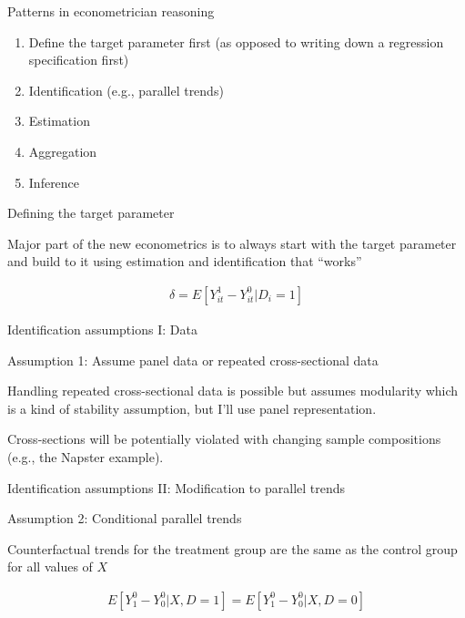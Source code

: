 \documentclass{beamer}
\begin{document}
\begin{frame}{Patterns in econometrician reasoning}

\begin{enumerate}
\item Define the target parameter first (as opposed to writing down a regression specification first)
\item Identification (e.g., parallel trends)
\item Estimation
\item Aggregation
\item Inference
\end{enumerate}

\end{frame}


\begin{frame}{Defining the target parameter}

Major part of the new econometrics is to always start with the target parameter and build to it using estimation and identification that ``works''

\bigskip

\begin{eqnarray*}
\delta = E[Y^1_{it} - Y^0_{it} | D_i=1]
\end{eqnarray*}

\end{frame}

\begin{frame}{Identification assumptions I: Data}

Assumption 1: Assume panel data or repeated cross-sectional data

\bigskip

Handling repeated cross-sectional data is possible but assumes modularity which is a kind of stability assumption, but I'll use panel representation. 

\bigskip

Cross-sections will be potentially violated with changing sample compositions (e.g., the Napster example). 

\end{frame}

\begin{frame}{Identification assumptions II: Modification to parallel trends}

Assumption 2: Conditional parallel trends

\bigskip

Counterfactual trends for the treatment group are the same as the control group for all values of $X$

\begin{eqnarray*}
E[Y_1^0 - Y_0^0 | X, D=1] = E[Y^0_1 - Y^0_0 | X, D=0]
\end{eqnarray*}

\end{frame}
\end{document}

